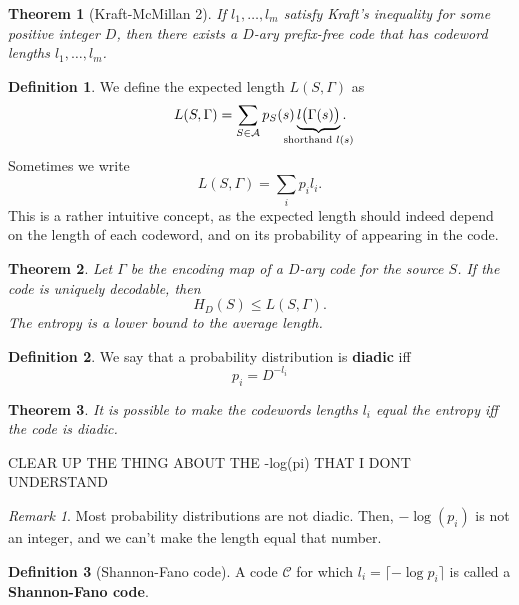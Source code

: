 \documentclass{article}
\theoremstyle{plain}
\newtheorem{thm}{Theorem}
\theoremstyle{definition}
\newtheorem{defn}{Definition}
\theoremstyle{remark}
\newtheorem*{remark}{Remark}
\begin{document}
\begin{thm}[Kraft-McMillan 2]
If $l_1, \ldots, l_m$ satisfy Kraft's inequality for some positive integer $D$, then there exists a $D$-ary prefix-free code that has codeword  lengths $l_1, \ldots, l_m$.
\end{thm}

\begin{defn}
We define the expected length $L(S, \Gamma)$ as
	\begin{equation*}
		L(S, \Gamma) = \sum_{S \in \mathcal A} p_S(s) \underbrace{l \bigl(\Gamma(s)\bigr)}_{{\mathclap{\text{shorthand } l(s)}}}.
	\end{equation*}
	Sometimes we write
	\begin{equation*}
		L(S, \Gamma) = \sum_i p_i l_i.
	\end{equation*}
This is a rather intuitive concept, as the expected length should indeed depend on the length of each codeword, and on its probability of appearing in the code.
\end{defn}

\begin{thm}
	Let $\Gamma$ be the encoding map of a $D$-ary code for the source $S$. If the code is uniquely decodable, then
	\begin{equation}
		H_D(S) \leq L(S, \Gamma).
	\end{equation}
	The entropy is a lower bound to the average length.
\end{thm}

\begin{defn}
	We say that a probability distribution is \textbf{diadic} iff
	\begin{equation*}
		p_i = D^{-l_i}
	\end{equation*}
\end{defn}

\begin{thm}
	It is possible to make the codewords lengths $l_i$ equal the entropy iff the code is diadic.
\end{thm}

CLEAR UP THE THING ABOUT THE -log(pi) THAT I DONT UNDERSTAND

\begin{remark}
	Most probability distributions are not diadic. Then, $-\log(p_i)$ is not an integer, and we can't make the length equal that number.
\end{remark}

\begin{defn}[Shannon-Fano code]
	A code $\mathcal C$ for which $l_i = \lceil -\log p_i \rceil$ is called a \textbf{Shannon-Fano code}.
\end{defn}
\end{document}
